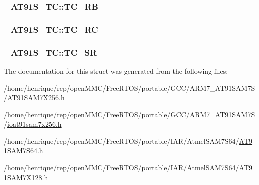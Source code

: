 \hypertarget{struct__AT91S__TC_a0ae10f9a6d3695b17618f62d254c2f20}{
\subsubsection[{T\-C\-\_\-\-R\-B}]{ \-\_\-\-A\-T91\-S\-\_\-\-T\-C\-::\-T\-C\-\_\-\-R\-B}}\label{struct__AT91S__TC_a0ae10f9a6d3695b17618f62d254c2f20}
\hypertarget{struct__AT91S__TC_adf8a3862cc1c6e10f09b682e36dcac2a}{
\subsubsection[{T\-C\-\_\-\-R\-C}]{ \-\_\-\-A\-T91\-S\-\_\-\-T\-C\-::\-T\-C\-\_\-\-R\-C}}\label{struct__AT91S__TC_adf8a3862cc1c6e10f09b682e36dcac2a}
\hypertarget{struct__AT91S__TC_a530883d094b52082a5d1fdd12e143eb2}{
\subsubsection[{T\-C\-\_\-\-S\-R}]{ \-\_\-\-A\-T91\-S\-\_\-\-T\-C\-::\-T\-C\-\_\-\-S\-R}}\label{struct__AT91S__TC_a530883d094b52082a5d1fdd12e143eb2}


The documentation for this struct was generated from the following files\-:\begin{DoxyCompactItemize}
\item 
/home/henrique/rep/open\-M\-M\-C/\-Free\-R\-T\-O\-S/portable/\-G\-C\-C/\-A\-R\-M7\-\_\-\-A\-T91\-S\-A\-M7\-S/\hyperlink{GCC_2ARM7__AT91SAM7S_2AT91SAM7X256_8h}{A\-T91\-S\-A\-M7\-X256.\-h}\item 
/home/henrique/rep/open\-M\-M\-C/\-Free\-R\-T\-O\-S/portable/\-G\-C\-C/\-A\-R\-M7\-\_\-\-A\-T91\-S\-A\-M7\-S/\hyperlink{ioat91sam7x256_8h}{ioat91sam7x256.\-h}\item 
/home/henrique/rep/open\-M\-M\-C/\-Free\-R\-T\-O\-S/portable/\-I\-A\-R/\-Atmel\-S\-A\-M7\-S64/\hyperlink{AT91SAM7S64_8h}{A\-T91\-S\-A\-M7\-S64.\-h}\item 
/home/henrique/rep/open\-M\-M\-C/\-Free\-R\-T\-O\-S/portable/\-I\-A\-R/\-Atmel\-S\-A\-M7\-S64/\hyperlink{AT91SAM7X128_8h}{A\-T91\-S\-A\-M7\-X128.\-h}\end{DoxyCompactItemize}

